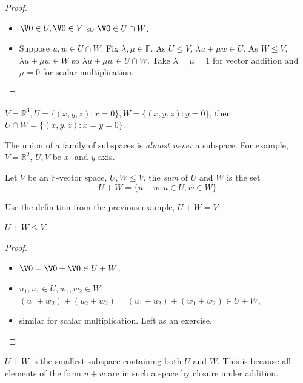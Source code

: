 \documentclass[a4paper]{article}
\theoremstyle{definition}
\begin{document}
\begin{proof}\leavevmode
  \begin{itemize}
  \item $\V 0 \in U, \V 0 \in V$ so $\V 0 \in U \cap W$.
    \item Suppose $u, w \in U \cap W$. Fix $\lambda, \mu \in \mathbb{F}$. As $U \leq V$, $\lambda u + \mu w \in U$. As $W \leq V$, $\lambda u +\mu w \in W$ so $\lambda u + \mu w \in U \cap W$. Take $\lambda = \mu = 1$ for vector addition and $\mu = 0$ for scalar multiplication.
  \end{itemize}
\end{proof}

\begin{eg}
  $V = \mathbb{R}^3, U = \{(x,y,z): x=0\}, W=\{(x,y,z):y=0\}$, then $U\cap W=\{(x,y,z):x=y=0\}$.
\end{eg}

\begin{note}
The union of a family of subspaces is \emph{almost never} a subspace. For example, $V = \mathbb{R}^2$, $U, V$ be $x$- and $y$-axis.
\end{note}

\begin{definition}
  Let $V$ be an $\mathbb{F}$-vector space, $U, W \leq V$, the \emph{sum} of $U$ and $W$ is the set
  \[
    U + W = \{u+w: u\in U, w\in W\}
  \]
\end{definition}

\begin{eg}
  Use the definition from the previous example, $U+W=V$.
\end{eg}

\begin{proposition}
  $U+W \leq V$.
\end{proposition}

\begin{proof}\leavevmode
  \begin{itemize}
  \item $\V 0 = \V 0 + \V 0 \in U+W$,
  \item $u_1,u_1\in U, w_1,w_2\in W$, $(u_1+w_2) + (u_2+w_2) = (u_1+u_2)+(w_1+w_2) \in U+W$,
    \item similar for scalar multiplication. Left as an exercise.
  \end{itemize}
\end{proof}

\begin{note}
  $U+W$ is the smallest subspace containing both $U$ and $W$. This is because all elements of the form $u+w$ are in such a space by closure under addition.
\end{note}
\end{document}

